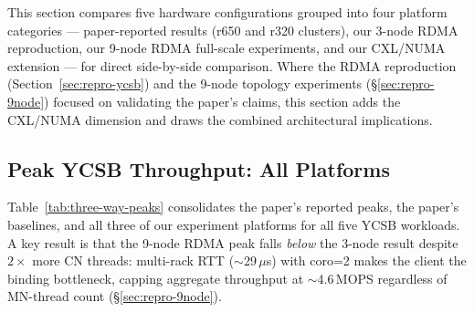 \documentclass[conference]{IEEEtran}
\begin{document}
This section compares five hardware configurations grouped into four platform categories --- paper-reported results (r650 and r320 clusters), our 3-node RDMA reproduction, our 9-node RDMA full-scale experiments, and our CXL/NUMA extension --- for direct side-by-side comparison. Where the RDMA reproduction (Section~\ref{sec:repro-ycsb}) and the 9-node topology experiments (\S\ref{sec:repro-9node}) focused on validating the paper's claims, this section adds the CXL/NUMA dimension and draws the combined architectural implications.

\subsection{Peak YCSB Throughput: All Platforms}

Table~\ref{tab:three-way-peaks} consolidates the paper's reported peaks, the paper's baselines, and all three of our experiment platforms for all five YCSB workloads. A key result is that the 9-node RDMA peak falls \emph{below} the 3-node result despite $2\times$ more CN threads: multi-rack RTT ($\sim$29\,$\mu$s) with coro=2 makes the client the binding bottleneck, capping aggregate throughput at $\sim$4.6\,MOPS regardless of MN-thread count (\S\ref{sec:repro-9node}).

\begin{table}[H]
\centering
\caption{Peak throughput across all platforms (MOPS per shard)}
\label{tab:three-way-peaks}
\scriptsize
{}
\end{table}
\end{document}
